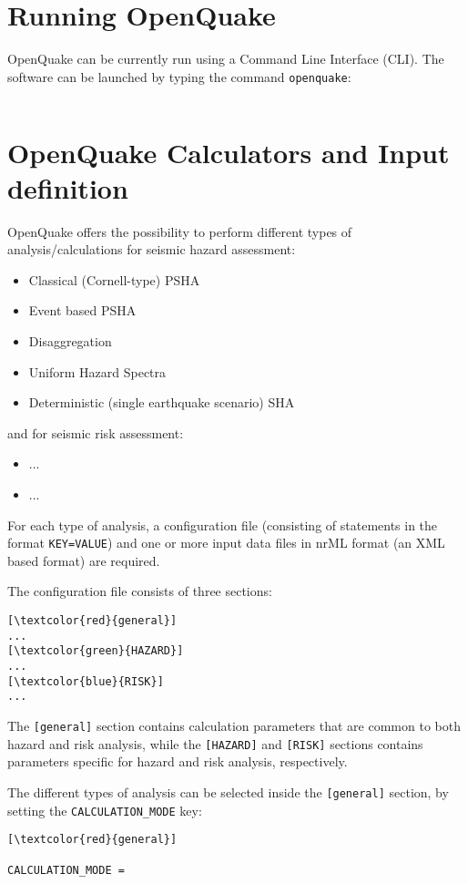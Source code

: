\section{Running OpenQuake}
OpenQuake can be currently run using a Command Line Interface (CLI). The software can be launched by typing the command \Verb+openquake+:
\begin{Verbatim}[frame=single, commandchars=\\\{\}, samepage=true]
\end{Verbatim}

\section{OpenQuake Calculators and Input definition}
OpenQuake offers the possibility to perform different types of analysis/calculations for seismic hazard assessment:
\begin{itemize}
\item Classical (Cornell-type) PSHA
\item Event based PSHA
\item Disaggregation 
\item Uniform Hazard Spectra 
\item Deterministic (single earthquake scenario) SHA
\end{itemize}

and for seismic risk assessment:
\begin{itemize}
\item ...
\item ...
\end{itemize}

For each type of analysis, a configuration file (consisting of statements in the format \Verb+KEY=VALUE+) and one or more input data files in nrML format (an XML based format) are required.

The configuration file consists of three sections:
\begin{Verbatim}[frame=single, commandchars=\\\{\}, samepage=true]
[\textcolor{red}{general}]
...
[\textcolor{green}{HAZARD}]
...
[\textcolor{blue}{RISK}]
...
\end{Verbatim}
 
The \Verb+[general]+ section contains calculation parameters that are common to both hazard and risk analysis, while the \Verb+[HAZARD]+ and \Verb+[RISK]+ sections contains parameters specific for hazard and risk analysis, respectively.

The different types of analysis can be selected inside the \Verb+[general]+ section, by setting  the \Verb+CALCULATION_MODE+ key:
\begin{Verbatim}[frame=single, commandchars=\\\{\}, samepage=true]
[\textcolor{red}{general}]

CALCULATION_MODE =
\end{Verbatim}


